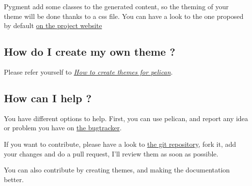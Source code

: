 \documentclass[letterpaper,10pt,english]{manual}
\begin{document}
Pygment add some classes to the generated content, so the theming of your theme
will be done thanks to a css file. You can have a look to the one proposed by
default \href{http://pygments.org/demo/15101/}{on the project website}


\subsection{How do I create my own theme ?}

Please refer yourself to \hyperlink{theming-pelican}{\emph{How to create themes for pelican}}.


\subsection{How can I help ?}

You have different options to help. First, you can use pelican, and report any
idea or problem you have on \href{http://github.com/ametaireau/pelican/issues}{the bugtracker}.

If you want to contribute, please have a look to \href{https://github.com/ametaireau/pelican/}{the git repository}, fork it, add your changes and do
a pull request, I'll review them as soon as possible.

You can also contribute by creating themes, and making the documentation
better.


\renewcommand{\indexname}{Module Index}
\printmodindex
\renewcommand{\indexname}{Index}
\printindex
\end{document}
